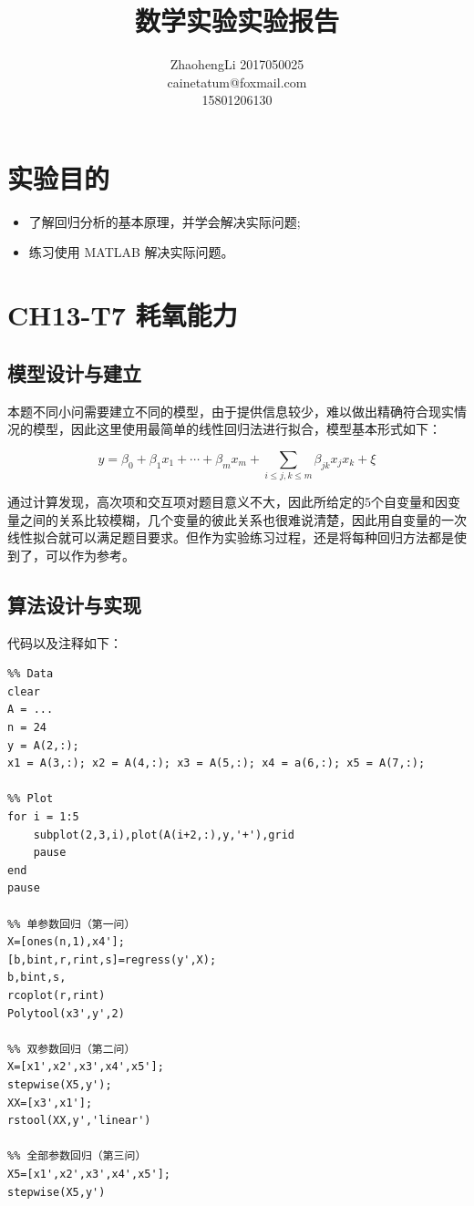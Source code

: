 \documentclass{article}
\title{数学实验实验报告}
\author{ZhaohengLi 2017050025\\cainetatum@foxmail.com\\15801206130}
\begin{document}
\maketitle
\section{实验目的}
\begin{itemize}
	\item{了解回归分析的基本原理，并学会解决实际问题;}
	\item{练习使用 MATLAB 解决实际问题。}
\end{itemize}


\section{CH13-T7 耗氧能力}
\subsection{模型设计与建立}
本题不同小问需要建立不同的模型，由于提供信息较少，难以做出精确符合现实情况的模型，因此这里使用最简单的线性回归法进行拟合，模型基本形式如下：

$$y=\beta_0+\beta_1x_1+\cdots+\beta_mx_m+\sum_{i\leq j,k\leq m}\beta_{jk}x_jx_k+\xi$$

通过计算发现，高次项和交互项对题目意义不大，因此所给定的5个自变量和因变量之间的关系比较模糊，几个变量的彼此关系也很难说清楚，因此用自变量的一次线性拟合就可以满足题目要求。但作为实验练习过程，还是将每种回归方法都是使到了，可以作为参考。

\subsection{算法设计与实现}

代码以及注释如下：

\begin{lstlisting}
%% Data
clear
A = ...
n = 24
y = A(2,:);
x1 = A(3,:); x2 = A(4,:); x3 = A(5,:); x4 = a(6,:); x5 = A(7,:);

%% Plot
for i = 1:5
	subplot(2,3,i),plot(A(i+2,:),y,'+'),grid
	pause
end
pause

%% 单参数回归（第一问）
X=[ones(n,1),x4'];
[b,bint,r,rint,s]=regress(y',X);
b,bint,s,
rcoplot(r,rint)
Polytool(x3',y',2)

%% 双参数回归（第二问）
X=[x1',x2',x3',x4',x5'];
stepwise(X5,y');
XX=[x3',x1'];
rstool(XX,y','linear')

%% 全部参数回归（第三问）
X5=[x1',x2',x3',x4',x5'];
stepwise(X5,y')

\end{lstlisting}
\end{document}
